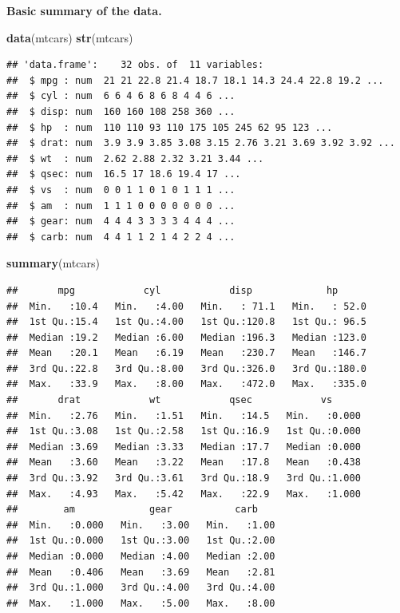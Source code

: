 \documentclass[]{article}
\newenvironment{Shaded}{\begin{snugshade}}{\end{snugshade}}
\newcommand{\KeywordTok}[1]{\textcolor[rgb]{0.13,0.29,0.53}{\textbf{{#1}}}}
\newcommand{\NormalTok}[1]{{#1}}
\begin{document}
\textbf{Basic summary of the data.}

\begin{Shaded}
\begin{Highlighting}[]
\KeywordTok{data}\NormalTok{(mtcars)}
\KeywordTok{str}\NormalTok{(mtcars)}
\end{Highlighting}
\end{Shaded}

\begin{verbatim}
## 'data.frame':    32 obs. of  11 variables:
##  $ mpg : num  21 21 22.8 21.4 18.7 18.1 14.3 24.4 22.8 19.2 ...
##  $ cyl : num  6 6 4 6 8 6 8 4 4 6 ...
##  $ disp: num  160 160 108 258 360 ...
##  $ hp  : num  110 110 93 110 175 105 245 62 95 123 ...
##  $ drat: num  3.9 3.9 3.85 3.08 3.15 2.76 3.21 3.69 3.92 3.92 ...
##  $ wt  : num  2.62 2.88 2.32 3.21 3.44 ...
##  $ qsec: num  16.5 17 18.6 19.4 17 ...
##  $ vs  : num  0 0 1 1 0 1 0 1 1 1 ...
##  $ am  : num  1 1 1 0 0 0 0 0 0 0 ...
##  $ gear: num  4 4 4 3 3 3 3 4 4 4 ...
##  $ carb: num  4 4 1 1 2 1 4 2 2 4 ...
\end{verbatim}

\begin{Shaded}
\begin{Highlighting}[]
\KeywordTok{summary}\NormalTok{(mtcars)}
\end{Highlighting}
\end{Shaded}

\begin{verbatim}
##       mpg            cyl            disp             hp       
##  Min.   :10.4   Min.   :4.00   Min.   : 71.1   Min.   : 52.0  
##  1st Qu.:15.4   1st Qu.:4.00   1st Qu.:120.8   1st Qu.: 96.5  
##  Median :19.2   Median :6.00   Median :196.3   Median :123.0  
##  Mean   :20.1   Mean   :6.19   Mean   :230.7   Mean   :146.7  
##  3rd Qu.:22.8   3rd Qu.:8.00   3rd Qu.:326.0   3rd Qu.:180.0  
##  Max.   :33.9   Max.   :8.00   Max.   :472.0   Max.   :335.0  
##       drat            wt            qsec            vs       
##  Min.   :2.76   Min.   :1.51   Min.   :14.5   Min.   :0.000  
##  1st Qu.:3.08   1st Qu.:2.58   1st Qu.:16.9   1st Qu.:0.000  
##  Median :3.69   Median :3.33   Median :17.7   Median :0.000  
##  Mean   :3.60   Mean   :3.22   Mean   :17.8   Mean   :0.438  
##  3rd Qu.:3.92   3rd Qu.:3.61   3rd Qu.:18.9   3rd Qu.:1.000  
##  Max.   :4.93   Max.   :5.42   Max.   :22.9   Max.   :1.000  
##        am             gear           carb     
##  Min.   :0.000   Min.   :3.00   Min.   :1.00  
##  1st Qu.:0.000   1st Qu.:3.00   1st Qu.:2.00  
##  Median :0.000   Median :4.00   Median :2.00  
##  Mean   :0.406   Mean   :3.69   Mean   :2.81  
##  3rd Qu.:1.000   3rd Qu.:4.00   3rd Qu.:4.00  
##  Max.   :1.000   Max.   :5.00   Max.   :8.00
\end{verbatim}
\end{document}
